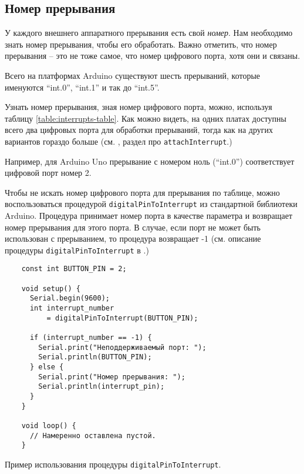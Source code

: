 \documentclass[../sparc.tex]{subfiles}
\begin{document}
\subsection{Номер прерывания}
\label{subsection:interrupts-number}

У каждого внешнего аппаратного прерывания есть свой \emph{номер}.  Нам
необходимо знать номер прерывания, чтобы его обработать.  Важно отметить, что
номер прерывания -- это не тоже самое, что номер цифрового порта, хотя они и
связаны.

Всего на платформах Arduino существуют шесть прерываний, которые именуются
``int.0'', ``int.1'' и так до ``int.5''.


Узнать номер прерывания, зная номер цифрового порта, можно, используя таблицу
\ref{table:interrupts-table}.  Как можно видеть, на одних платах доступны всего
два цифровых порта для обработки прерываний, тогда как на других вариантов
гораздо больше (см. \cite{arduino:reference}, раздел про
\texttt{attachInterrupt}.)

Например, для Arduino Uno прерывание с номером ноль (``int.0'') соответствует
цифровой порт номер 2.

Чтобы не искать номер цифрового порта для прерывания по таблице, можно
воспользоваться процедурой \texttt{digitalPinToInterrupt} из стандартной
библиотеки Arduino.  Процедура принимает номер порта в качестве параметра и
возвращает номер прерывания для этого порта.  В случае, если порт не может быть
использован с прерыванием, то процедура возвращает -1 (см. описание процедуры
\texttt{digitalPinToInterrupt} в \cite{arduino:reference}.)

\begin{listing}[H]
  \begin{verbatim}
    const int BUTTON_PIN = 2;

    void setup() {
      Serial.begin(9600);
      int interrupt_number
          = digitalPinToInterrupt(BUTTON_PIN);

      if (interrupt_number == -1) {
        Serial.print("Неподдерживаемый порт: ");
        Serial.println(BUTTON_PIN);
      } else {
        Serial.print("Номер прерывания: ");
        Serial.println(interrupt_pin);
      }
    }

    void loop() {
      // Намеренно оставлена пустой.
    }
  \end{verbatim}
  \caption{Пример использования процедуры \texttt{digitalPinToInterrupt}.}
  \label{listing:interrupts-digital-pin-to-interrupt}
\end{listing}
\end{document}
